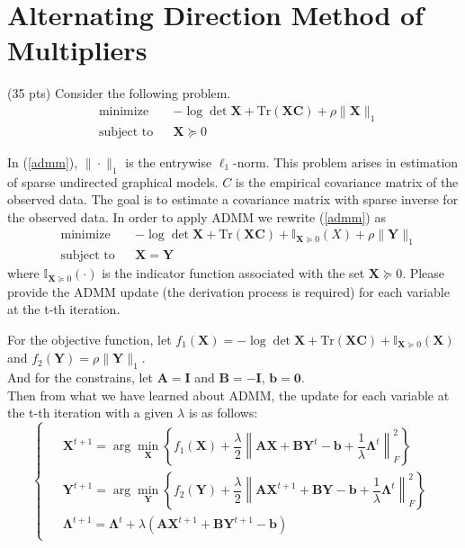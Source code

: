 \section{Alternating Direction Method of Multipliers}
{\color{red} (35 pts)} Consider the following problem.
\begin{equation}
\begin{aligned}
\label{admm}
& \text{minimize }
& & -\log \det \mathbf{X} + \text{Tr}(\mathbf{XC}) + \rho\|\mathbf{X}\|_1 \\
& \text{subject to}
& & \mathbf{X} \succeq 0
\end{aligned}
\end{equation}

In (\ref{admm}), \(\| \cdot \|_1\) is the entrywise \(\ell_1\)-norm. This problem arises in estimation of sparse undirected graphical models. \( C \) is the empirical covariance matrix of the observed data. The goal is to estimate a covariance matrix with sparse inverse for the observed data. In order to apply ADMM we rewrite (\ref{admm}) as
\begin{equation}
\begin{aligned}
& \text{minimize }
& & -\log \det \mathbf{X} + \text{Tr}(\mathbf{XC}) + \mathbb{I}_{\mathbf{X} \succeq 0}(X) + \rho\|\mathbf{Y}\|_1\\
& \text{subject to}
& &  \mathbf{X} = \mathbf{Y}
\end{aligned}
\end{equation}
where $\mathbb{I}_{\mathbf{X} \succeq 0}(\cdot)$ is the indicator function associated with the set $\mathbf{X} \succeq 0$. Please provide the ADMM update (the derivation process is required) for each variable at the t-th iteration.

\solution{}

For the objective function, let $f_1(\mathbf{X})=-\log\det \mathbf{X}+\text{Tr}(\mathbf{XC})+\mathbb{I}_{\mathbf{X}\succeq 0}(\mathbf{X})$ and $f_2(\mathbf{Y})=\rho\|\mathbf{Y}\|_1$.\\
And for the constrains, let $\mathbf{A}=\mathbf{I}$ and $\mathbf{B}=-\mathbf{I}$, $\mathbf{b}=\mathbf{0}$.\\
Then from what we have learned about ADMM, the update for each variable at the t-th iteration with a given $\lambda$ is as follows:
$$\begin{cases}
\begin{aligned}
&\mathbf{X}^{t+1}=\arg\min_{\mathbf{X}}\left\{f_1(\mathbf{X})+\dfrac{\lambda}{2}\left\|\mathbf{AX}+\mathbf{BY}^t-\mathbf{b}+\dfrac{1}{\lambda}\mathbf{\Lambda}^t\right\|_F^2\right\}\\
&\mathbf{Y}^{t+1}=\arg\min_{\mathbf{Y}}\left\{f_2(\mathbf{Y})+\dfrac{\lambda}{2}\left\|\mathbf{AX}^{t+1}+\mathbf{BY}-\mathbf{b}+\dfrac{1}{\lambda}\mathbf{\Lambda}^t\right\|_F^2\right\}\\
&\mathbf{\Lambda}^{t+1}=\mathbf{\Lambda}^t+\lambda(\mathbf{AX}^{t+1}+\mathbf{BY}^{t+1}-\mathbf{b})
\end{aligned}
\end{cases}$$

